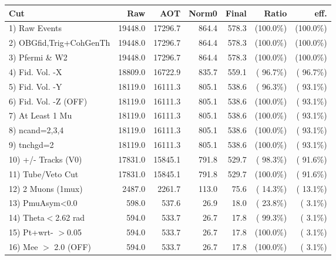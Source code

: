  \begin{table}[h!]\centering
 \begin{tabular}{||l||r|r|r|r|r|r||}
 \hline
 \hline
 Cut & Raw & AOT & Norm0 & Final & Ratio & eff.       \\
 \hline
  1) Raw Events           &      19448.0 &      17296.7 &        864.4 &        578.3 & (100.0\%) & (100.0\%) \\
  2) OBGfid,Trig+CohGenTh &      19448.0 &      17296.7 &        864.4 &        578.3 & (100.0\%) & (100.0\%) \\
  3) Pfermi \& W2         &      19448.0 &      17296.7 &        864.4 &        578.3 & (100.0\%) & (100.0\%) \\
  4) Fid. Vol. -X         &      18809.0 &      16722.9 &        835.7 &        559.1 & ( 96.7\%) & ( 96.7\%) \\
  5) Fid. Vol. -Y         &      18119.0 &      16111.3 &        805.1 &        538.6 & ( 96.3\%) & ( 93.1\%) \\
  6) Fid. Vol. -Z (OFF)   &      18119.0 &      16111.3 &        805.1 &        538.6 & (100.0\%) & ( 93.1\%) \\
  7) At Least 1 Mu        &      18119.0 &      16111.3 &        805.1 &        538.6 & (100.0\%) & ( 93.1\%) \\
  8) ncand=2,3,4          &      18119.0 &      16111.3 &        805.1 &        538.6 & (100.0\%) & ( 93.1\%) \\
  9) tnchgd=2             &      18119.0 &      16111.3 &        805.1 &        538.6 & (100.0\%) & ( 93.1\%) \\
 10) +/- Tracks (V0)      &      17831.0 &      15845.1 &        791.8 &        529.7 & ( 98.3\%) & ( 91.6\%) \\
 11) Tube/Veto Cut        &      17831.0 &      15845.1 &        791.8 &        529.7 & (100.0\%) & ( 91.6\%) \\
 12) 2 Muons (1mux)       &       2487.0 &       2261.7 &        113.0 &         75.6 & ( 14.3\%) & ( 13.1\%) \\
 13) PmuAsym<0.0          &        598.0 &        537.6 &         26.9 &         18.0 & ( 23.8\%) & (  3.1\%) \\
 14) Theta$<$2.62 rad     &        594.0 &        533.7 &         26.7 &         17.8 & ( 99.3\%) & (  3.1\%) \\
 15) Pt+wrt- $>$0.05      &        594.0 &        533.7 &         26.7 &         17.8 & (100.0\%) & (  3.1\%) \\
 16) Mee $>$ 2.0  (OFF)   &        594.0 &        533.7 &         26.7 &         17.8 & (100.0\%) & (  3.1\%) \\

\end{tabular}
\end{table}
